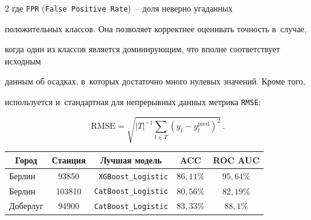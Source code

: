 \begin{multicols}{2}
где \verb"FPR" (\verb"False Positive Rate")~-- доля неверно угаданных 

положительных классов. Она позволяет корректнее оценивать точность в~случае, 

когда один из классов является доминирующим, что вполне соответствует исходным 

данным об осадках, в~которых достаточно много нулевых значений. Кроме того, 

используется и~стандартная для непрерывных данных метрика \verb"RMSE":

\begin{equation}

\label{RMSE}

\mathrm{RMSE} = \sqrt{|T|^{-1}\sum\limits_{t\in T} \left(y_t - y^{\mathrm{pred}}_t\right)^2}\,.

\end{equation}



\begin{table}[b]\small %

\begin{center}


\vspace*{2ex}





\begin{tabular}{|l|c|r|l|c|}

\hline

\multicolumn{1}{|c|}{{\bf Город} }& 

\multicolumn{1}{c|}{{\bf Станция}} & 

\multicolumn{1}{c|}{{\bf Лучшая модель}} & 

\multicolumn{1}{c|}{{\bf ACC}}& \multicolumn{1}{c|}{{\bf ROC AUC}} \\

\hline

      Берлин &   \hphantom{9}93850 &   \verb"XGBoost_Logistic" &  $86{,}11\%$ &  $95{,}64\%$ \\

      Берлин &  103810 &  \verb"CatBoost_Logistic" &  $80{,}56\%$ &  $82{,}19\%$ \\

    Доберлуг &   \hphantom{9}94900 &  \verb"CatBoost_Logistic" &  $83{,}33\%$ &  $88{,}1\%$\hphantom{9} \\


\end{tabular}
\end{center}
\end{table}
\end{multicols}
